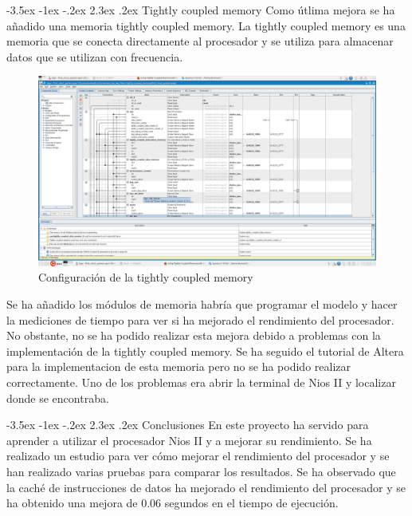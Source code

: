 \documentclass[11pt]{report}
\makeatletter
\renewcommand\chapter{\@startsection{chapter}{0}{\z@}%
    {-3.5ex \@plus -1ex \@minus -.2ex}%
    {2.3ex \@plus.2ex}%
    {\normalfont\Large\bfseries}}
\makeatother
\begin{document}
\newpage

\chapter{Tightly coupled memory}
Como útlima mejora se ha añadido una memoria tightly coupled memory. La tightly coupled memory es una memoria que se conecta directamente al
procesador y se utiliza para almacenar datos que se utilizan con frecuencia. 

\begin{figure}[H]
  \centering
  \includegraphics[scale=0.34]{img/tightly_coupled_memory.jpeg}
  \caption{Configuración de la tightly coupled memory}
\end{figure}

Se ha añadido los módulos de memoria habría que programar el modelo y hacer la mediciones de tiempo para ver si ha mejorado el rendimiento del
procesador. No obstante, no se ha podido realizar esta mejora debido a problemas con la implementación de la tightly coupled memory. Se ha seguido
el tutorial de Altera para la implementacion de esta memoria pero no se ha podido realizar correctamente. Uno de los problemas era abrir la terminal
de Nios II y localizar donde se encontraba.

\newpage

\chapter{Conclusiones}
En este proyecto ha servido para aprender a utilizar el procesador Nios II y a mejorar su rendimiento. Se ha realizado un estudio para ver cómo
mejorar el rendimiento del procesador y se han realizado varias pruebas para comparar los resultados. Se ha observado que la caché de instrucciones
de datos ha mejorado el rendimiento del procesador y se ha obtenido una mejora de 0.06 segundos en el tiempo de ejecución.
\end{document}
